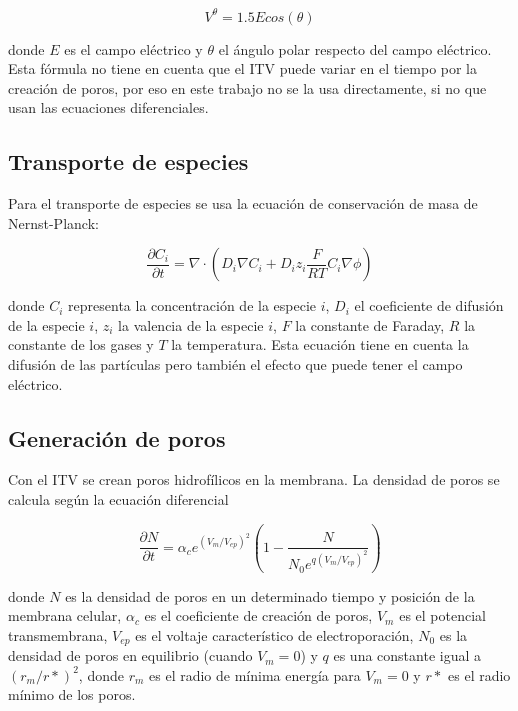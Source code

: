 \documentclass[a4paper,10pt]{article}
\begin{document}
\begin{equation} \label{eq:cos}
	V^{\theta} = 1.5 E cos (\theta)
\end{equation}

donde $E$ es el campo eléctrico y $\theta$ el ángulo polar respecto del campo eléctrico. Esta fórmula no tiene en cuenta que el ITV puede variar en el tiempo por la creación de poros, por eso en este trabajo no se la usa directamente, si no que usan las ecuaciones diferenciales. 

\subsection{Transporte de especies}
Para el transporte de especies se usa la ecuación de conservación de masa de Nernst-Planck:

\begin{equation} \label{eq:trans}
	\frac{\partial C_i}{\partial t} = \nabla \cdot \left( D_i \nabla C_i + D_i z_i \frac{F}{R T} C_i \nabla \phi \right)
\end{equation}

donde $C_i$ representa la concentración de la especie $i$, $D_i$ el coeficiente de difusión de la especie $i$, $z_i$ la valencia de la especie $i$, $F$ la constante de Faraday, $R$ la constante de los gases y $T$ la temperatura. Esta ecuación tiene en cuenta la difusión de las partículas pero también el efecto que puede tener el campo eléctrico.\\


\subsection{Generación de poros}
Con el ITV se crean poros hidrofílicos en la membrana. La densidad de poros se calcula según la ecuación diferencial  

\begin{equation} \label{eq:poros-crea}
	\frac{\partial N}{\partial t} = \alpha_c e^{(V_m/V_{ep})^2} \left( 1 - \frac{N}{N_0 e^{q \left(V_m/V_{ep} \right) ^2}} \right)
\end{equation}

donde $N$ es la densidad de poros en un determinado tiempo y posición de la membrana celular, $\alpha_c$ es el coeficiente de creación de poros, $V_m$ es el potencial transmembrana, $V_{ep}$ es el voltaje característico de electroporación, $N_0$ es la densidad de poros en equilibrio (cuando $V_m = 0$) y $q$ es una constante igual a $(r_m / r*)^2$, donde $r_m$ es el radio de mínima energía para $V_m = 0$ y $r*$ es el radio mínimo de los poros.\\
\end{document}
